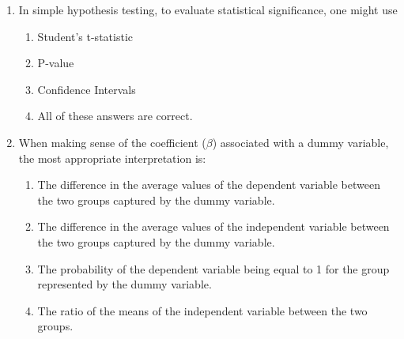 \documentclass{article}
\begin{document}
\begin{enumerate}
\begin{enumerate}[label=\alph*)]
\item The number of observations in the treatment and control groups are different, which might indicate the first OLS assumption is violated.
\item  The averages reported in the first two columns are sometimes statistically different from zero,  which might indicate the first OLS assumption is violated.
\item The averages reported in the last column are sometimes statistically different from zero,  which might indicate the first OLS assumption is violated.
\item None of these answers are correct.
\end{enumerate}\vspace{.25cm}


\item In simple hypothesis testing, to evaluate statistical significance, one might use

\begin{enumerate}[label=\alph*)]
\item Student's t-statistic
\item P-value
\item Confidence Intervals
\item All of these answers are correct.
\end{enumerate}\vspace{.25cm}

\item When making sense of the coefficient ($\beta$) associated with a dummy variable, the most appropriate interpretation is:
\begin{enumerate}[label=\alph*)]
    \item The difference in the average values of the dependent variable between the two groups captured by the dummy variable.
    \item The difference in the average values of the independent variable between the two groups captured by the dummy variable.
    \item The probability of the dependent variable being equal to 1 for the group represented by the dummy variable.
    \item The ratio of the means of the independent variable between the two groups.
\end{enumerate}\vspace{.25cm}




\end{enumerate}
\end{document}

